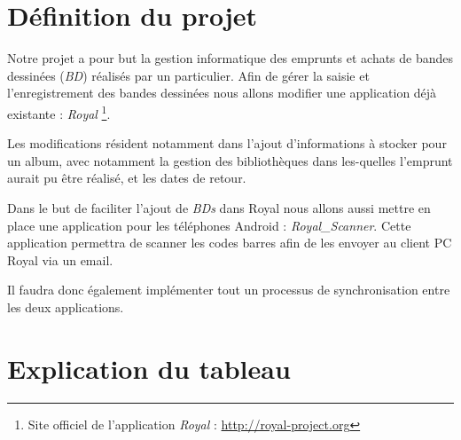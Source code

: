 \documentclass[etudiants]{support-iutrs}
\begin{document}
\header
\section*{Définition du projet}

Notre projet a pour but la gestion informatique des emprunts et achats de bandes dessinées (\emph{BD}) réalisés par un particulier.
Afin de gérer la saisie et l'enregistrement des bandes dessinées nous allons modifier une application déjà existante : \emph{Royal}
\footnote{Site officiel de l'application \emph{Royal} : \url{http://royal-project.org}}.

Les modifications résident notamment dans l'ajout d'informations à stocker pour un album, avec notamment la gestion des bibliothèques dans les-quelles l'emprunt aurait pu être réalisé, et les dates de retour. 

Dans le but de faciliter l'ajout de \emph{BDs} dans Royal nous allons aussi mettre en place une application pour les téléphones Android : \emph{Royal\_Scanner}.
Cette application permettra de scanner les codes barres afin de les envoyer au client PC Royal via un email.

Il faudra donc également implémenter tout un processus de synchronisation entre les deux applications. 

\section*{Explication du tableau}
\end{document}
